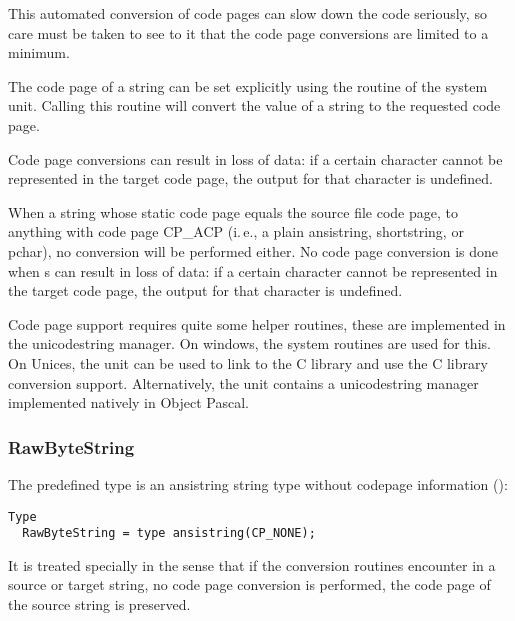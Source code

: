 This automated conversion of code pages can slow down the code seriously, so care must be
taken to see to it that the code page conversions are limited to a minimum.



The code page of a string can be set explicitly using the  routine of the system unit.
Calling this routine will convert the value of a string to the requested code page.

\begin{remark}
Code page conversions can result in loss of data: if a certain character cannot be represented in the target
code page, the output for that character is undefined.
\end{remark}

\begin{remark}
When a string whose static code page equals the source file code page, to anything with
code page CP\_ACP (i.\,e., a plain ansistring, shortstring, or pchar), no conversion will
be performed either.
No code page conversion is done when
s can result in loss of data: if a certain character cannot be represented in the target
code page, the output for that character is undefined.
\end{remark}

\begin{remark}
Code page support requires quite some helper routines, these are implemented in the unicodestring manager.
On windows, the system routines are used for this. On Unices, the  unit can be used to link
to the C library and use the C library conversion support.
Alternatively, the  unit contains a unicodestring manager implemented natively in Object Pascal.
\end{remark}


\subsubsection{RawByteString}
The predefined  type is an ansistring string type without codepage information ():
\begin{verbatim}
Type
  RawByteString = type ansistring(CP_NONE);
\end{verbatim}
It is treated specially in the sense that if the conversion routines encounter  in a
source or target string, no code page conversion is performed, the code page of the source string is preserved.


